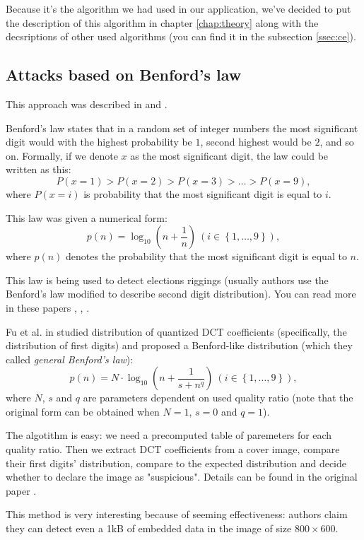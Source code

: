 Because it's the algorithm we had used in our application, 
we've decided to put the description of this algorithm in chapter \ref{chap:theory}
along with the decsriptions of other used algorithms (you can find it in the subsection
\ref{ssec:ce}).

\subsection{Attacks based on Benford's law}

This approach was described in \cite{andriotis2013two} and \cite{andriotis2013jpeg}.

Benford's law states that in a random set of integer numbers the most significant digit would
with the highest probability be $1$, second highest would be $2$, and so on. Formally, if we denote $x$
as the most significant digit, the law could be written as this:
$$P(x = 1) > P(x = 2) > P(x = 3) > \ldots > P(x = 9),$$
where $P(x = i)$ is probability that the most significant digit is equal to $i$.

This law was given a numerical form:
$$p(n) = \log_{10}\left(n + \frac{1}{n}\right) ~\left(i \in \left\{ 1, \ldots , 9 \right\}\right),$$
where $p(n)$ denotes the probability that the most significant digit is equal to $n$.

This law is being used to detect elections riggings (usually authors use the Benford's law modified to 
describe second digit distribution). You can read more in these papers \cite{mebane2006election}, \cite{roukema2009benford}, \cite{deckert2011benford}.

Fu et al. in \cite{fu2007generalized} studied distribution of quantized DCT coefficients (specifically, the distribution of first digits)
and proposed a Benford-like distribution (which they called \emph{general Benford's law}):
$$p(n) = N \cdot \log_{10}\left(n + \frac{1}{s + n^q}\right) ~\left(i \in \left\{ 1, \ldots , 9 \right\}\right), $$
where $N$, $s$ and $q$ are parameters dependent on used quality ratio (note that the original form can be obtained when
$N = 1$, $s = 0$ and $q = 1$).

The algotithm is easy: we need a precomputed table of paremeters for each quality ratio. Then we extract DCT coefficients
from a cover image, compare their first digits' distribution, compare to the expected distribution and decide whether to
declare the image as "suspicious". Details can be found in the original paper \cite{andriotis2013two}.

This method is very interesting because of seeming effectiveness: authors claim they can detect even a 1kB of embedded data
in the image of size $800 \times 600$.

